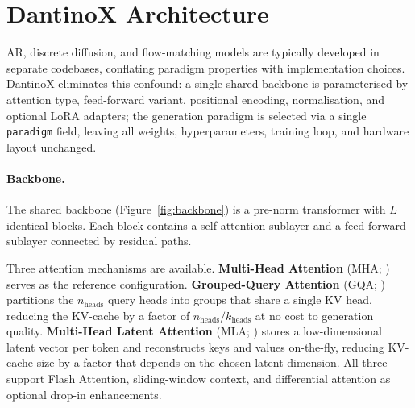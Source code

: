 
\section{DantinoX Architecture}

AR, discrete diffusion, and flow-matching models are typically developed in
separate codebases, conflating paradigm properties with implementation choices.
DantinoX eliminates this confound: a single shared backbone is parameterised by
attention type, feed-forward variant, positional encoding, normalisation, and
optional LoRA adapters; the generation paradigm is selected via a single
\texttt{paradigm} field, leaving all weights, hyperparameters, training loop,
and hardware layout unchanged.

\paragraph{Backbone.}
The shared backbone (Figure~\ref{fig:backbone}) is a pre-norm transformer with
$L$ identical blocks.
Each block contains a self-attention sublayer and a feed-forward sublayer
connected by residual paths.

Three attention mechanisms are available.
\textbf{Multi-Head Attention}
(MHA; \citealt{vaswani-etal-2017-attention}) serves as the reference
configuration.
\textbf{Grouped-Query Attention} (GQA; \citealt{ainslie-etal-2023-gqa})
partitions the $n_\mathrm{heads}$ query heads into groups that share a single
KV head, reducing the KV-cache by a factor of
$n_\mathrm{heads}/k_\mathrm{heads}$ at no cost to generation quality.
\textbf{Multi-Head Latent Attention} (MLA; \citealt{deepseekv2-2024}) stores a
low-dimensional latent vector per token and reconstructs keys and values
on-the-fly, reducing KV-cache size by a factor that depends on the chosen
latent dimension.
All three support Flash Attention, sliding-window context, and differential
attention as optional drop-in enhancements.

